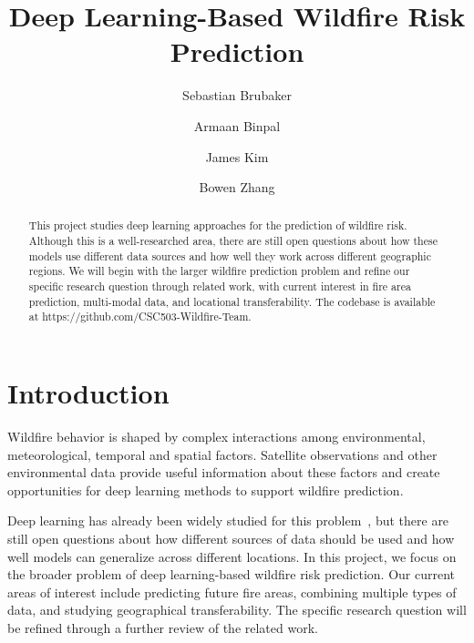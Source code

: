 \documentclass[sigconf]{acmart}
\begin{document}
\title{Deep Learning-Based Wildfire Risk Prediction}
\author{Sebastian Brubaker}

\author{Armaan Binpal}

\author{James Kim}

\author{Bowen Zhang}

\begin{abstract}
This project studies deep learning approaches for the prediction of wildfire risk. Although this is a well-researched area, there are still open questions about how these models use different data sources and how well they work across different geographic regions. We will begin with the larger wildfire prediction problem and refine our specific research question through related work, with current interest in fire area prediction, multi-modal data, and locational transferability. The codebase is available at https://github.com/CSC503-Wildfire-Team.
\end{abstract}

\maketitle

\section{Introduction}

Wildfire behavior is shaped by complex interactions among environmental, meteorological, temporal and spatial factors. Satellite observations and other environmental data provide useful information about these factors and create opportunities for deep learning methods to support wildfire prediction.

Deep learning has already been widely studied for this problem~\cite{XU2025632}, but there are still open questions about how different sources of data should be used and how well models can generalize across different locations. In this project, we focus on the broader problem of deep learning-based wildfire risk prediction. Our current areas of interest include predicting future fire areas, combining multiple types of data, and studying geographical transferability. The specific research question will be refined through a further review of the related work.
\end{document}
